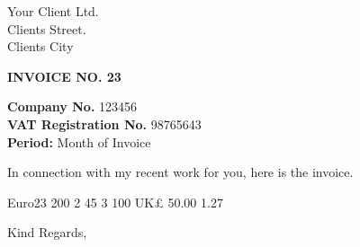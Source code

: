 \documentclass{letter}
\date{Date Issued}
\begin{document}
\longindentation=0pt
  \begin{letter}{Your Client Ltd. \\ Clients Street. \\ Clients City}
\centerline{\bf \sc INVOICE NO. 23} \par    
\opening{\textbf{Company No.} 123456 
		\\ \textbf{VAT Registration No.} 98765643 
		\\ \textbf{Period:} Month of Invoice }
    In connection with my recent work for you, here is the invoice.
    \begin{invoice}{Euro}{23}  %
       {200} {2}
       {45} {3}
 {100} {}
 {UK£} {50.00} {1.27} {}
    \end{invoice}
    \closing{Kind Regards,}
  \end{letter}
\end{document}
